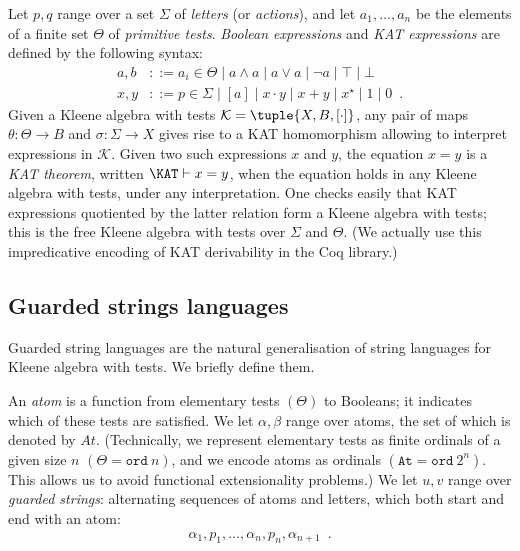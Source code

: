 \documentclass[a4paper]{llncs}
\begin{document}
Let $p,q$ range over a set $\Sigma$ of \emph{letters} (or
\emph{actions}), and let $a_1,\dots,a_n$ be the elements of a finite
set $\Theta$ of \emph{primitive tests}. \emph{Boolean expressions} and
\emph{KAT expressions} are defined by the following syntax:
\begin{align*}
  \tag{Boolean expressions}
  a,b &::= a_i\in \Theta \mid a\land a \mid a\lor a \mid \neg a \mid
  \top \mid \bot\\
  \tag{KAT expressions}
  x,y &::= p\in \Sigma \mid [a] \mid x\cdot y \mid x+y \mid
  x^\star \mid 1 \mid 0\enspace.
\end{align*}
Given a Kleene algebra with tests $\mathcal K=\tuple{X,B,[\cdot]}$,
any pair of maps $\theta: \Theta\to B$ and $\sigma: \Sigma\to X$ gives
rise to a KAT homomorphism allowing to interpret expressions in
$\mathcal K$.
Given two such expressions $x$ and $y$, the equation $x=y$ is a
\emph{KAT theorem}, written $\KAT\vdash x=y$, when the equation holds
in any Kleene algebra with tests, under any interpretation. One checks
easily that KAT expressions quotiented by the latter relation form a
Kleene algebra with tests; this is the free Kleene algebra with tests
over $\Sigma$ and $\Theta$. (We actually use this impredicative
encoding of KAT derivability in the Coq library.)




\subsection{Guarded strings languages}
\label{ssec:gsl:model}

Guarded string languages are the natural generalisation of string
languages for Kleene algebra with tests. We briefly define them.

An \emph{atom} is a function from elementary tests $(\Theta)$ to
Booleans; it indicates which of these tests are satisfied. We let
$\alpha,\beta$ range over atoms, the set of which is denoted by $At$.
(Technically, we represent elementary tests as finite ordinals of a
given size $n$ $(\Theta=\mathtt{ord}~n)$, and we encode atoms as
ordinals $(\mathtt{At=ord}~2^n)$. This allows us to avoid functional
extensionality problems.) We let $u,v$ range over \emph{guarded
  strings}: alternating sequences of atoms and letters, which both start and end
with an atom:
\begin{align*}
  \alpha_1,p_1,\dots,\alpha_n,p_n,\alpha_{n+1}\enspace.
\end{align*}
\end{document}
